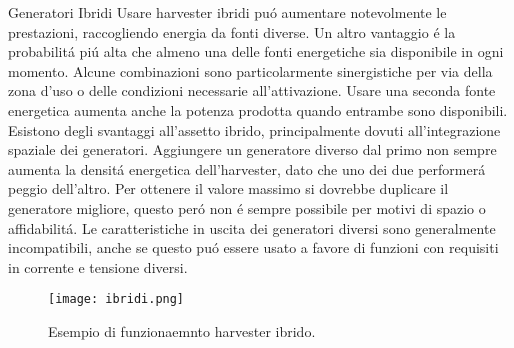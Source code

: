 \begin{section}{Generatori Ibridi}
    Usare harvester ibridi pu\'o aumentare notevolmente le prestazioni, raccogliendo energia da fonti diverse. Un altro vantaggio \'e la probabilit\'a pi\'u alta che almeno una delle fonti energetiche sia disponibile in ogni momento. Alcune combinazioni sono particolarmente sinergistiche per via della zona d'uso o delle condizioni necessarie all'attivazione. Usare una seconda fonte energetica aumenta anche la potenza prodotta quando entrambe sono disponibili. Esistono degli svantaggi all'assetto ibrido, principalmente dovuti all'integrazione spaziale dei generatori. Aggiungere un generatore diverso dal primo non sempre aumenta la densit\'a energetica dell'harvester, dato che uno dei due performer\'a peggio dell'altro. Per ottenere il valore massimo si dovrebbe duplicare il generatore migliore, questo per\'o non \'e sempre possibile per motivi di spazio o affidabilit\'a. Le caratteristiche in uscita dei generatori diversi sono generalmente incompatibili, anche se questo pu\'o essere usato a favore di funzioni con requisiti in corrente e tensione diversi\cite{shaukatApplicationsSustainableHybrid2023}.
    \begin{figure}[H]
        \texttt{[image: ibridi.png]}
        \centering
        \caption{Esempio di funzionaemnto harvester ibrido.}
        \label{fig:ibridi}
    \end{figure}
\end{section}

